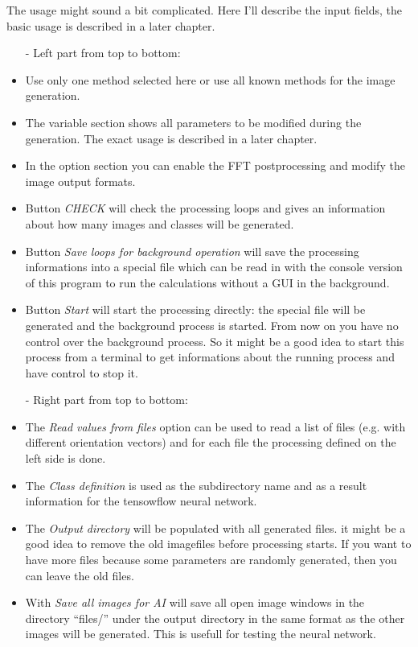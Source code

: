 \documentclass[11pt]{article} %
\begin{document}
The usage might sound a bit complicated. Here I'll describe the input fields, the basic usage is described in a later chapter.
\begin{itemize}\itemsep0pt
\item[-] Left part from top to bottom:
\item Use only one method selected here or use all known methods for the image generation.
\item The variable section shows all parameters to be modified during the generation. The exact usage is described in a later chapter.
\item In the option section you can enable the FFT postprocessing and modify the image output formats.
\item Button {\it CHECK} will check the processing loops and gives an information about how many images and classes will be generated.
\item Button {\it Save loops for background operation} will save the processing informations into a special file which can be read in with the console version of this program to run the calculations without a GUI in the background.
\item Button {\it Start} will start the processing directly: the special file will be generated and the background process is started. From now on you have no control over the background process. So it might be a good idea to start this process from a terminal to get informations about the running process and have control to stop it.
\item[-] Right part from top to bottom:
\item The {\it Read values from files} option can be used to read a list of files (e.g. with different orientation vectors) and for each file the processing defined on the left side is done.
\item The {\it Class definition} is used as the subdirectory name and as a result information for the tensowflow neural network.
\item The {\it Output directory} will be populated with all generated files. it might be a good idea to remove the old imagefiles before processing starts. If you want to have more files because some parameters are randomly generated, then you can leave the old files.
\item With {\it Save all images for AI} will save all open image windows in the directory ``files/'' under the output directory in the same format as the other images will be generated. This is usefull for testing the neural network.
\end{itemize}
\end{document}
